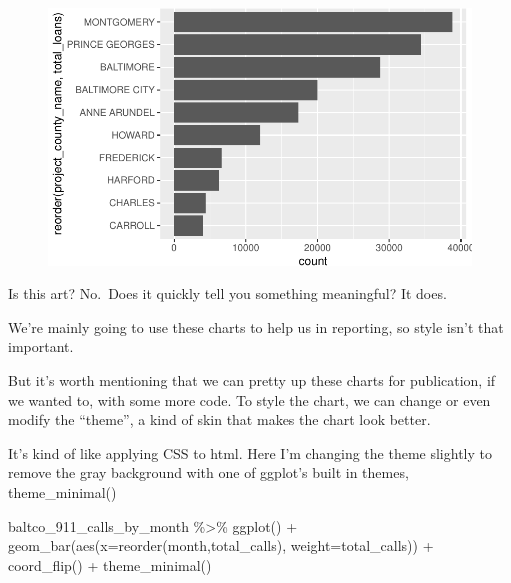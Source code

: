 \documentclass[
  letterpaper,
  DIV=11,
  numbers=noendperiod]{scrreprt}
\newenvironment{Shaded}{\begin{snugshade}}{\end{snugshade}}
\newcommand{\AttributeTok}[1]{\textcolor[rgb]{0.40,0.45,0.13}{#1}}
\newcommand{\FunctionTok}[1]{\textcolor[rgb]{0.28,0.35,0.67}{#1}}
\newcommand{\NormalTok}[1]{\textcolor[rgb]{0.00,0.23,0.31}{#1}}
\newcommand{\SpecialCharTok}[1]{\textcolor[rgb]{0.37,0.37,0.37}{#1}}
\begin{document}
\begin{figure}[H]

{\centering \includegraphics{./visualizing-for-reporting_files/figure-pdf/unnamed-chunk-7-1.pdf}

}

\end{figure}

Is this art? No.~Does it quickly tell you something meaningful? It does.

We're mainly going to use these charts to help us in reporting, so style
isn't that important.

But it's worth mentioning that we can pretty up these charts for
publication, if we wanted to, with some more code. To style the chart,
we can change or even modify the ``theme'', a kind of skin that makes
the chart look better.

It's kind of like applying CSS to html. Here I'm changing the theme
slightly to remove the gray background with one of ggplot's built in
themes, theme\_minimal()

\begin{Shaded}
\begin{Highlighting}[]
\NormalTok{baltco\_911\_calls\_by\_month }\SpecialCharTok{\%\textgreater{}\%}
  \FunctionTok{ggplot}\NormalTok{() }\SpecialCharTok{+}
  \FunctionTok{geom\_bar}\NormalTok{(}\FunctionTok{aes}\NormalTok{(}\AttributeTok{x=}\FunctionTok{reorder}\NormalTok{(month,total\_calls), }\AttributeTok{weight=}\NormalTok{total\_calls)) }\SpecialCharTok{+}
  \FunctionTok{coord\_flip}\NormalTok{() }\SpecialCharTok{+} 
  \FunctionTok{theme\_minimal}\NormalTok{()}
\end{Highlighting}
\end{Shaded}
\end{document}
